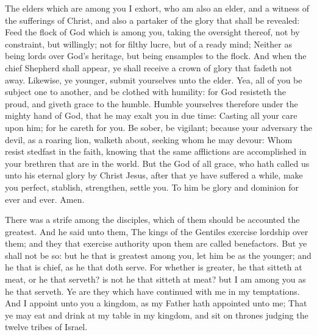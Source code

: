  The elders which are among you I exhort, who am also an elder, and a witness of the sufferings of Christ, and also a partaker of the glory that shall be revealed: Feed the flock of God which is among you, taking the oversight thereof, not by constraint, but willingly; not for filthy lucre, but of a ready mind; Neither as being lords over God's heritage, but being ensamples to the flock. And when the chief Shepherd shall appear, ye shall receive a crown of glory that fadeth not away. Likewise, ye younger, submit yourselves unto the elder. Yea, all of you be subject one to another, and be clothed with humility: for God resisteth the proud, and giveth grace to the humble. Humble yourselves therefore under the mighty hand of God, that he may exalt you in due time: Casting all your care upon him; for he careth for you. Be sober, be vigilant; because your adversary the devil, as a roaring lion, walketh about, seeking whom he may devour: Whom resist stedfast in the faith, knowing that the same afflictions are accomplished in your brethren that are in the world. But the God of all grace, who hath called us unto his eternal glory by Christ Jesus, after that ye have suffered a while, make you perfect, stablish, strengthen, settle you. To him be glory and dominion for ever and ever. Amen.


 There was a strife among the disciples, which of them should be accounted the greatest. And he said unto them, The kings of the Gentiles exercise lordship over them; and they that exercise authority upon them are called benefactors. But ye shall not be so: but he that is greatest among you, let him be as the younger; and he that is chief, as he that doth serve. For whether is greater, he that sitteth at meat, or he that serveth? is not he that sitteth at meat? but I am among you as he that serveth. Ye are they which have continued with me in my temptations. And I appoint unto you a kingdom, as my Father hath appointed unto me; That ye may eat and drink at my table in my kingdom, and sit on thrones judging the twelve tribes of Israel.

